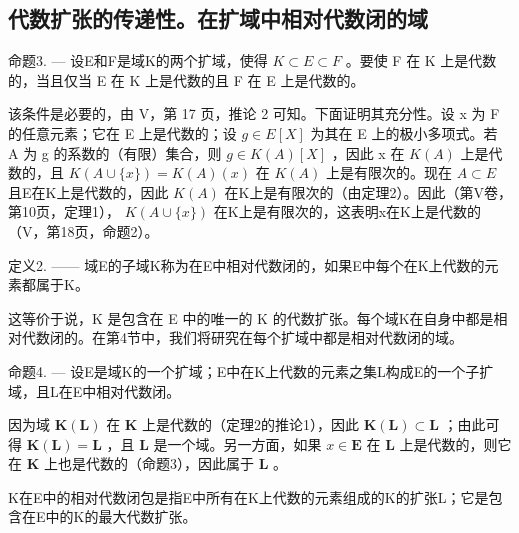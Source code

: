 \subsection{代数扩张的传递性。在扩域中相对代数闭的域}

命题3. --- 设E和F是域K的两个扩域，使得 \(K \subset E \subset F\) 。要使 F 在 K 上是代数的，当且仅当 E 在 K 上是代数的且 F 在 E 上是代数的。

该条件是必要的，由 V，第 17 页，推论 2 可知。下面证明其充分性。设 x 为 F 的任意元素；它在 E 上是代数的；设 \(g \in E[X]\) 为其在 E 上的极小多项式。若 A 为 g 的系数的（有限）集合，则 \(g \in K(A)[X]\) ，因此 x 在 \(K(A)\) 上是代数的，且 \(K(A \cup \{x\}) = K(A)(x)\) 在 \(K(A)\) 上是有限次的。现在 \(A \subset E\) 且E在K上是代数的，因此 \(K(A)\) 在K上是有限次的（由定理2）。因此（第V卷，第10页，定理1）， \(K(A \cup \{x\})\) 在K上是有限次的，这表明x在K上是代数的（V，第18页，命题2）。

定义2. —— 域E的子域K称为在E中相对代数闭的，如果E中每个在K上代数的元素都属于K。

这等价于说，K 是包含在 E 中的唯一的 K 的代数扩张。每个域K在自身中都是相对代数闭的。在第4节中，我们将研究在每个扩域中都是相对代数闭的域。

命题4. --- 设E是域K的一个扩域；E中在K上代数的元素之集L构成E的一个子扩域，且L在E中相对代数闭。

因为域 \(\mathbf{K}(\mathbf{L})\) 在 \(\mathbf{K}\) 上是代数的（定理2的推论1），因此 \(\mathbf{K}(\mathbf{L}) \subset \mathbf{L}\) ；由此可得 \(\mathbf{K}(\mathbf{L}) = \mathbf{L}\) ，且 \(\mathbf{L}\) 是一个域。另一方面，如果 \(x \in \mathbf{E}\) 在 \(\mathbf{L}\) 上是代数的，则它在 \(\mathbf{K}\) 上也是代数的（命题3），因此属于 \(\mathbf{L}\) 。

K在E中的相对代数闭包是指E中所有在K上代数的元素组成的K的扩张L；它是包含在E中的K的最大代数扩张。

